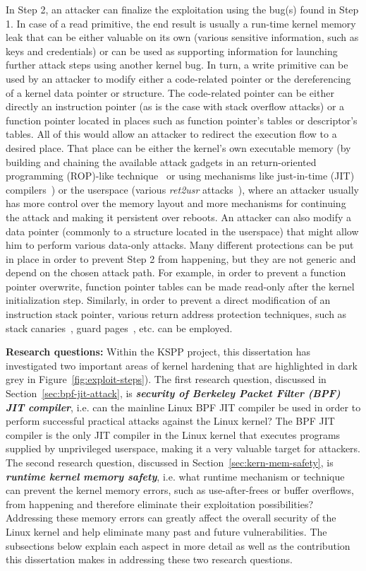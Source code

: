 In Step 2, an attacker can finalize the exploitation using the bug(s) found in Step 1. In case of a read primitive, the end result is usually a run-time kernel memory leak that can be either valuable on its own (various sensitive information, such as keys and credentials) or can be used as supporting information for launching further attack steps using another kernel bug. In turn, a write primitive can be used by an attacker to modify either a code-related pointer or the dereferencing of a kernel data pointer or structure. The code-related pointer can be either directly an instruction pointer (as is the case with stack overflow attacks) or a function pointer located in places such as function pointer's tables or descriptor's tables. All of this would allow an attacker to redirect the execution flow to a desired place. That place can be either the kernel's own executable memory (by building and chaining the available attack gadgets in an return-oriented programming (ROP)-like technique~\cite{Shacham2007} or using mechanisms like just-in-time (JIT) compilers~\cite{Aycock03abrief}) or the userspace (various \textit{ret2usr} attacks~\cite{Kemerlis2012}), where an attacker usually has more control over the memory layout and more mechanisms for continuing the attack and making it persistent over reboots. An attacker can also modify a data pointer (commonly to a structure located in the userspace) that might allow him to perform various data-only attacks. Many different protections can be put in place in order to prevent Step 2 from happening, but they are not generic and depend on the chosen attack path. For example, in order to prevent a function pointer overwrite, function pointer tables can be made read-only after the kernel initialization step. Similarly, in order to prevent a direct modification of an instruction stack pointer, various return address protection techniques, such as stack canaries~\cite{edge2014}, guard pages~\cite{kstackoverflow2017}, etc. can be employed.   

\textbf{Research questions:}   Within the KSPP project, this dissertation has investigated two important areas of kernel hardening that are highlighted in dark grey in Figure~\ref{fig:exploit-steps}). The first research question, discussed in Section~\ref{sec:bpf-jit-attack}, is \textit{\textbf{security of Berkeley Packet Filter (BPF) JIT compiler}}, i.e. can the mainline Linux BPF JIT compiler be used in order to perform successful practical attacks against the Linux kernel? The BPF JIT compiler is the only JIT compiler in the Linux kernel that executes programs supplied by unprivileged userspace, making it a very valuable target for attackers.  The second research question, discussed in Section~\ref{sec:kern-mem-safety}, is \textbf{\textbf{\textit{runtime kernel memory safety}}}, i.e. what runtime mechanism or technique can prevent the kernel memory errors, such as use-after-frees or buffer overflows, from happening and therefore eliminate their exploitation possibilities? Addressing these memory errors can greatly affect the overall security of the Linux kernel and help eliminate many past and future vulnerabilities. The subsections below explain each aspect in more detail as well as the contribution this dissertation makes in addressing these two research questions.  

